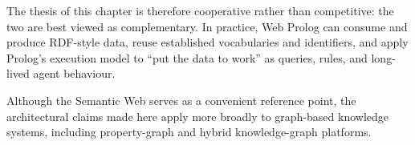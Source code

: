 The thesis of this chapter is therefore cooperative rather than competitive: the two are best viewed as complementary. In practice, Web Prolog can consume and produce RDF-style data, reuse established vocabularies and identifiers, and apply Prolog's execution model to ``put the data to work'' as queries, rules, and long-lived agent behaviour.

Although the Semantic Web serves as a convenient reference point, the architectural claims made here apply more broadly to graph-based knowledge systems, including property-graph and hybrid knowledge-graph platforms.

%
%
%
%


